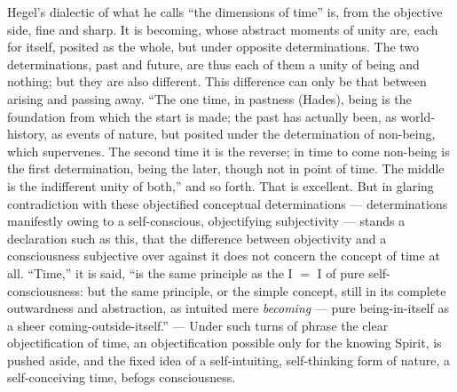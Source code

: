 \documentclass[12pt,a4paper]{book}
\begin{document}
Hegel's dialectic of what he calls ``the dimensions of time''
is, from the objective side, fine and sharp. It is becoming, whose abstract
moments of unity are, each for itself, posited as the whole, but under opposite
determinations. The two determinations, past and future, are thus each of them a
unity of being and nothing; but they are also different. This difference can only
be that between arising and passing away. ``The one time, in pastness (Hades),
being is the foundation from which the start is made; the past has actually been,
as world-history, as events of nature, but posited under the determination of
non-being, which supervenes. The second time it is the reverse; in time to come
non-being is the first determination, being the later, though not in point of
time. The middle is the indifferent unity of both,'' and so forth. That is
excellent. But in glaring contradiction with these objectified conceptual
determinations --- determinations manifestly owing to a self-conscious,
objectifying subjectivity --- stands a declaration such as this, that the
difference between objectivity and a consciousness subjective over against it
does not concern the concept of time at all. ``Time,'' it is said,
``is the same principle as the I $=$ I of pure self-consciousness: but the same
principle, or the simple concept, still in its complete outwardness and
abstraction, as intuited mere \emph{becoming} --- pure being-in-itself as a
sheer coming-outside-itself.'' --- Under such turns of phrase the clear
objectification of time, an objectification possible only for the knowing Spirit,
is pushed aside, and the fixed idea of a self-intuiting, self-thinking form of
nature, a self-conceiving time, befogs consciousness.
\end{document}
